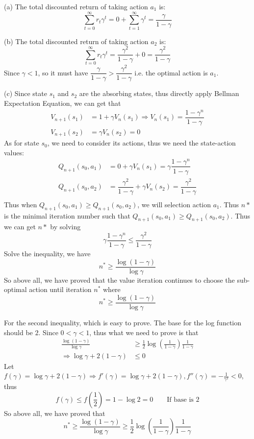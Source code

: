 \begin{homeworkProblem}
\solution

(a) The total discounted return of taking action $a_1$ is:
$$\sum_{t=0}^{\infty} r_t \gamma^t = 0 + \sum_{t=1}^{\infty} \gamma^t = \dfrac{\gamma}{1-\gamma}$$

(b) The total discounted return of taking action $a_2$ is:
$$\sum_{t=0}^{\infty} r_t \gamma^t = \frac{\gamma^2}{1-\gamma} + 0 = \dfrac{\gamma^2}{1-\gamma}$$
Since $\gamma < 1$, so it must have $\dfrac{\gamma}{1-\gamma}>\dfrac{\gamma^2}{1-\gamma}$ i.e. the optimal action is $a_1$.

(c) Since state $s_1$ and $s_2$ are the absorbing states, thus directly apply Bellman Expectation Equation, we can get that
\begin{align*}
V_{n+1}(s_1) &= 1 + \gamma V_n(s_1) \Rightarrow V_n(s_1)=\dfrac{1-\gamma^n}{1-\gamma} \\
V_{n+1}(s_2) &= \gamma V_n(s_2) = 0
\end{align*}
As for state $s_0$, we need to consider its actions, thus we need the state-action values:
\begin{align*}
Q_{n+1}(s_0, a_1) &= 0 + \gamma V_n(s_1) = \gamma \dfrac{1-\gamma^n}{1-\gamma} \\
Q_{n+1}(s_0, a_2) &= \dfrac{\gamma^2}{1-\gamma} + \gamma V_n(s_2) = \dfrac{\gamma^2}{1-\gamma} \\
\end{align*}
Thus when $Q_{n+1}(s_0, a_1)\geq Q_{n+1}(s_0, a_2)$, we will selection action $a_1$. Thus $n*$ is the minimal iteration number such that $Q_{n+1}(s_0, a_1)\geq Q_{n+1}(s_0, a_2)$. Thus we can get $n*$ by solving
$$\gamma \dfrac{1-\gamma^n}{1-\gamma} \leq \dfrac{\gamma^2}{1-\gamma}$$
Solve the inequality, we have
$$n^* \geq \dfrac{\log(1-\gamma)}{\log \gamma}$$
So above all, we have proved that the value iteration continues to choose the sub-optimal action until iteration $n^*$  where
$$n^* \geq \dfrac{\log(1-\gamma)}{\log \gamma}$$

For the second inequality, which is easy to prove. The base for the log function should be $2$. Since $0<\gamma<1$, thus what we need to prove is that
\begin{align*}
\frac{\log (1-\gamma)}{\log \gamma} &\geq \frac{1}{2} \log \left(\frac{1}{1-\gamma}\right) \frac{1}{1-\gamma} \\
\Rightarrow \log\gamma + 2(1-\gamma) &\leq 0
\end{align*}
Let $f(\gamma)=\log\gamma + 2(1-\gamma)\Rightarrow f'(\gamma)=\log\gamma+2(1-\gamma), f''(\gamma)=-\frac{1}{\gamma^2}<0$, thus
$$f(\gamma)\leq f\left(\frac{1}{2}\right)=1 - \log 2 = 0\qquad\text{If base is $2$}$$
So above all, we have proved that
$$n^* \geq \frac{\log (1-\gamma)}{\log \gamma} \geq \frac{1}{2} \log \left(\frac{1}{1-\gamma}\right) \frac{1}{1-\gamma}$$

\end{homeworkProblem}

\newpage